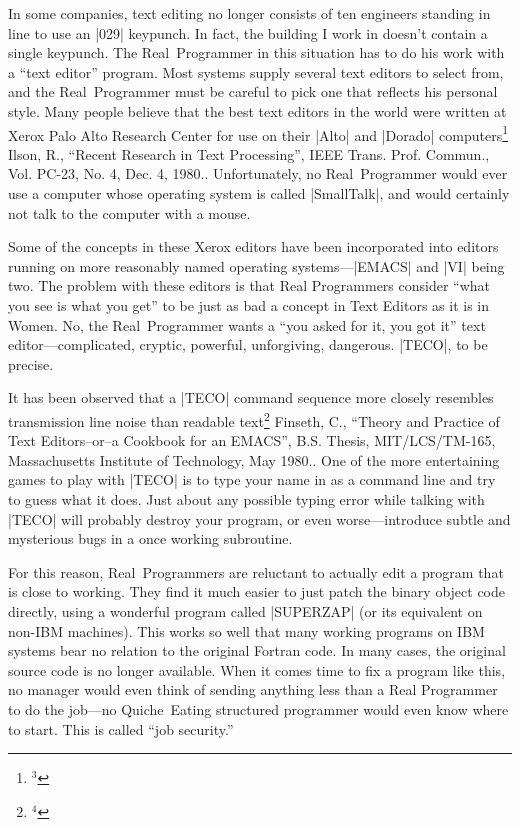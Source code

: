 In some companies, text editing no longer consists of ten engineers
standing in line to use an |029| keypunch. In fact, the building I work
in doesn't contain a single keypunch. The Real~Programmer in this
situation has to do his work with a ``text editor'' program. Most
systems supply several text editors to select from, and the Real~Programmer
must be careful to pick one that reflects his personal
style. Many people believe that the best text editors in the world
were written at Xerox Palo Alto Research Center for use on their |Alto|
and |Dorado| computers\footnote{$^3$}{%
Ilson, R., ``Recent Research in Text Processing'', IEEE Trans. Prof. Commun., Vol. PC-23, No. 4, Dec. 4, 1980.}.
Unfortunately, no Real~Programmer would ever
use a computer whose operating system is called |SmallTalk|, and would
certainly not talk to the computer with a mouse.

Some of the concepts in these Xerox editors have been incorporated
into editors running on more reasonably named operating systems---|EMACS|
and |VI| being two. The problem with these editors is that Real
Programmers consider ``what you see is what you get'' to be just as bad
a concept in Text Editors as it is in Women. No, the Real~Programmer
wants a ``you asked for it, you got it'' text editor---complicated,
cryptic, powerful, unforgiving, dangerous. |TECO|, to be precise.

It has been observed that a |TECO| command sequence more closely
resembles transmission line noise than readable text\footnote{$^4$}{%
Finseth, C., ``Theory and Practice of Text Editors--or--a Cookbook for an EMACS'', B.S. Thesis, MIT/LCS/TM-165, Massachusetts Institute of Technology, May 1980.}.
One of the
more entertaining games to play with |TECO| is to type your name in as a
command line and try to guess what it does. Just about any possible
typing error while talking with |TECO| will probably destroy your
program, or even worse---introduce subtle and mysterious bugs in a
once working subroutine.

For this reason, Real~Programmers are reluctant to actually edit a
program that is close to working. They find it much easier to just
patch the binary object code directly, using a wonderful program
called |SUPERZAP| (or its equivalent on non-IBM machines). This works so
well that many working programs on IBM systems bear no relation to the
original Fortran code. In many cases, the original source code is no
longer available. When it comes time to fix a program like this, no
manager would even think of sending anything less than a Real
Programmer to do the job---no Quiche~Eating structured programmer
would even know where to start. This is called ``job security.''

